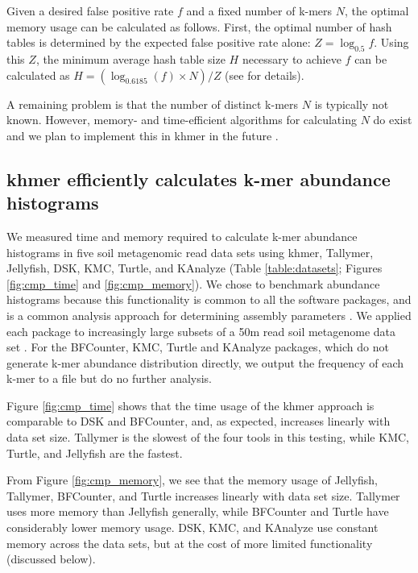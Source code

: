 Given a desired false positive rate $f$ and a fixed number of k-mers
$N$, the optimal memory usage can be calculated as follows.  First,
the optimal number of hash tables is determined by the expected false
positive rate alone: $Z = \log_{0.5}f$.  Using this $Z$, the minimum
average hash table size $H$ necessary to achieve $f$ can be calculated
as $H = (\log_{0.6185}(f)\times N)/Z$ (see
\cite{broder2004network} for details).

A remaining problem is that the number of distinct k-mers $N$ is
typically not known.  However, memory- and time-efficient algorithms
for calculating $N$ do exist and we plan to implement this in
khmer in the future \cite{flajolet2008hyperloglog}.

\subsection{khmer efficiently calculates k-mer abundance histograms}

We measured time and memory required to calculate k-mer abundance
histograms in five soil metagenomic read data sets using khmer,
Tallymer, Jellyfish, DSK, KMC, Turtle, and KAnalyze (Table
\ref{table:datasets}; Figures \ref{fig:cmp_time} and
\ref{fig:cmp_memory}).  We chose to benchmark abundance histograms
because this functionality is common to all the software packages, and
is a common analysis approach for determining assembly parameters
\cite{Chikhi:2014aa}.  We applied each package to increasingly large
subsets of a 50m read soil metagenome data set \cite{Howe2012}. For
the BFCounter, KMC, Turtle and KAnalyze packages, which do not
generate k-mer abundance distribution directly, we output the
frequency of each k-mer to a file but do no further analysis.

Figure \ref{fig:cmp_time} shows that the time usage of the khmer
approach is comparable to DSK and BFCounter, and, as expected,
increases linearly with data set size. Tallymer is the slowest of the
four tools in this testing, while KMC, Turtle, and Jellyfish are
the fastest.

From Figure \ref{fig:cmp_memory}, we see that the memory usage of
Jellyfish, Tallymer, BFCounter, and Turtle increases linearly with
data set size. Tallymer uses more memory than Jellyfish generally,
while BFCounter and Turtle have considerably lower memory usage.
DSK, KMC, and KAnalyze use constant memory across the data sets, but
at the cost of more limited functionality (discussed below).


